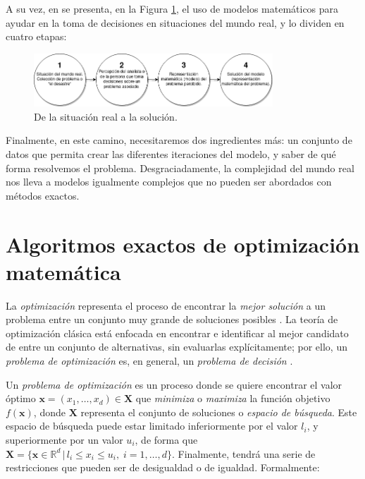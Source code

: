 \documentclass[12pt,a4paper]{book}
\begin{document}
A su vez, en \cite{silver_overview_2004} se presenta, en la Figura \ref{fig:realPr_to_solution}, el uso de modelos matemáticos para ayudar en la toma de decisiones en situaciones del mundo real, y lo dividen en cuatro etapas:

\begin{figure}[h]
    \begin{center}
    \includegraphics[width=0.8\textwidth]{img/problemToSolution.png}
    \end{center}
    \caption{De la situación real a la solución.}
    \label{fig:realPr_to_solution}
\end{figure} 

Finalmente, en este camino, necesitaremos dos ingredientes más: un conjunto de datos que permita crear las diferentes iteraciones del modelo, y saber de qué forma resolvemos el problema. Desgraciadamente, la complejidad del mundo real nos lleva a modelos igualmente complejos que no pueden ser abordados con métodos exactos. 
%
\section{Algoritmos exactos de optimización matemática} \label{Subsec: 3_2}
La \textsl{optimización} representa el proceso de encontrar la \textsl{mejor solución} a un problema entre un conjunto muy grande de soluciones posibles \cite{cuevas_matlab_2021}. La teoría de optimización clásica está enfocada en encontrar e identificar al mejor candidato de entre un conjunto de alternativas, sin evaluarlas explícitamente; por ello, un \textsl{problema de optimización} es, en general, un \textsl{problema de decisión} \cite{gparedes_hernandez_fundamentos_2021}.  

Un \textsl{problema de optimización} es un proceso donde se quiere encontrar el valor óptimo $\mathbf{x} = (x_1, \ldots, x_d) \in \mathbf{X}$ que \textsl{minimiza} o \textsl{maximiza} la función objetivo $f(\mathbf{x})$, donde $\mathbf{X}$ representa el conjunto de soluciones o \textsl{espacio de búsqueda}. Este espacio de búsqueda puede estar limitado inferiormente por el valor $l_i$, y superiormente por un valor $u_i$, de forma que $\mathbf{X} = \{ \mathbf{x} \in \mathbb{R}^d \, \vert \, l_i \leq x_i \leq u_i, \; i = 1, \ldots, d \}$. Finalmente, tendrá una serie de restricciones que pueden ser de desigualdad o de igualdad. Formalmente: 
\end{document}

